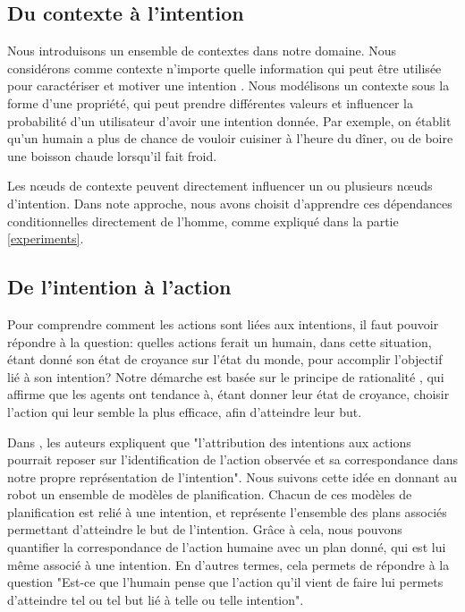 \documentclass[a4paper,11pt,twoside]{StyleThese}
\begin{document}
\subsection{Du contexte à l'intention}
Nous introduisons un ensemble de contextes dans notre domaine. Nous considérons comme contexte n'importe quelle information qui peut être utilisée pour caractériser et motiver une intention \cite{abowd1999towards}. Nous modélisons un contexte sous la forme d'une propriété, qui peut prendre différentes valeurs et influencer la probabilité d'un utilisateur d'avoir une intention donnée. Par exemple, on établit qu'un humain a plus de chance de vouloir cuisiner à l'heure du dîner, ou de boire une boisson chaude lorsqu'il fait froid.

Les nœuds de contexte peuvent directement influencer un ou plusieurs nœuds d'intention. Dans note approche, nous avons choisit d'apprendre ces dépendances conditionnelles directement de l'homme, comme expliqué dans la partie \ref{experiments}.

\subsection{De l'intention à l'action}
\label{action_evaluation}
Pour comprendre comment les actions sont liées aux intentions, il faut pouvoir répondre à la question: quelles actions ferait un humain, dans cette situation, étant donné son état de croyance sur l'état du monde, pour accomplir l'objectif lié à son intention? 
Notre démarche est basée sur le principe de rationalité \cite{Dennet1989}, qui affirme que les agents ont tendance à, étant donner leur état de croyance, choisir l'action qui leur semble la plus efficace, afin d'atteindre leur but.

Dans \cite{Blakemore2001}, les auteurs expliquent que "l'attribution des intentions aux actions pourrait reposer sur l'identification de l'action observée et sa correspondance dans notre propre représentation de l'intention". Nous suivons cette idée en donnant au robot un ensemble de modèles de planification. Chacun de ces modèles de planification est relié à une intention, et représente l'ensemble des plans associés permettant d'atteindre le but de l'intention. Grâce à cela, nous pouvons quantifier la correspondance de l'action humaine avec un plan donné, qui est lui même associé à une intention. En d'autres termes, cela permets de répondre à la question "Est-ce que l'humain pense que l'action qu'il vient de faire lui permets d'atteindre tel ou tel but lié à telle ou telle intention".
\end{document}

